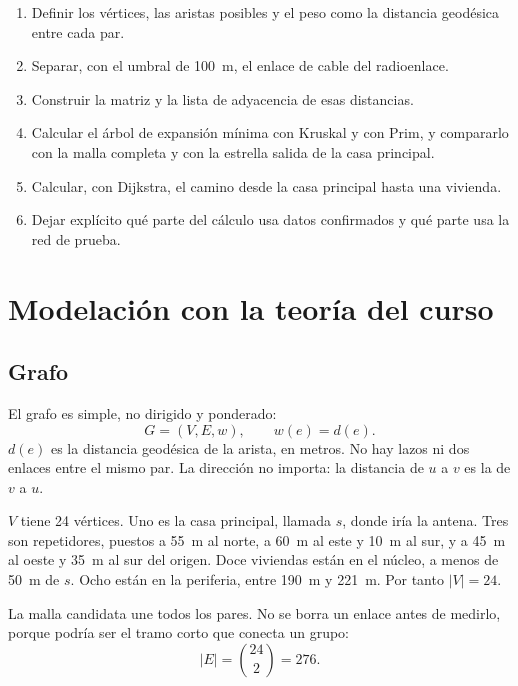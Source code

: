 \documentclass[12pt,a4paper]{article}
\begin{document}
\begin{enumerate}
  \item Definir los vértices, las aristas posibles y el peso como la distancia geodésica entre cada par.
  \item Separar, con el umbral de 100~m, el enlace de cable del radioenlace.
  \item Construir la matriz y la lista de adyacencia de esas distancias.
  \item Calcular el árbol de expansión mínima con Kruskal y con Prim, y compararlo con la malla completa y con la estrella salida de la casa principal.
  \item Calcular, con Dijkstra, el camino desde la casa principal hasta una vivienda.
  \item Dejar explícito qué parte del cálculo usa datos confirmados y qué parte usa la red de prueba.
\end{enumerate}

\section{Modelación con la teoría del curso}

\subsection{Grafo}

El grafo es simple, no dirigido y ponderado:
\begin{equation}
  G = (V, E, w), \qquad w(e) = d(e).
  \label{eq:grafo}
\end{equation}
\(d(e)\) es la distancia geodésica de la arista, en metros. No hay lazos ni dos enlaces entre el mismo par. La dirección no importa: la distancia de \(u\) a \(v\) es la de \(v\) a \(u\).

\(V\) tiene 24 vértices. Uno es la casa principal, llamada \(s\), donde iría la antena. Tres son repetidores, puestos a 55~m al norte, a 60~m al este y 10~m al sur, y a 45~m al oeste y 35~m al sur del origen. Doce viviendas están en el núcleo, a menos de 50~m de \(s\). Ocho están en la periferia, entre 190~m y 221~m. Por tanto \(|V| = 24\).

La malla candidata une todos los pares. No se borra un enlace antes de medirlo, porque podría ser el tramo corto que conecta un grupo:
\begin{equation}
  |E| = \binom{24}{2} = 276.
  \label{eq:aristas}
\end{equation}
\end{document}

